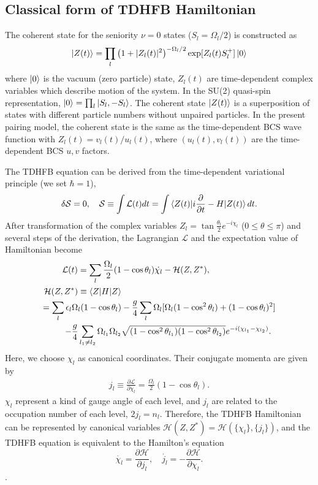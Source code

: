 \documentclass[%
superscriptaddress,
showpacs,
nofootinbib,
amsmath,amssymb,
aps,
prc,
twocolumn,
floatfix ]%
{revtex4-1}
\begin{document}
\subsection{Classical form of TDHFB Hamiltonian}
The coherent state for the seniority $\nu=0$ states
($S_l=\Omega_l/2$) is constructed as
\begin{equation}
	\ket{Z(t)} = \prod_{l} \left(1+|Z_l(t)|^2\right)^{-\Omega_l/2}
	\exp [Z_l(t) S_l^{+}] \ket{0}
 \label{coherent}
\end{equation}
where $\ket{0}$ is the vacuum (zero particle) state,
$Z_l(t)$ are time-dependent complex variables which describe
motion of the system. 
In the SU(2) quasi-spin representation,
$\ket{0}=\prod_l \ket{S_l,-S_l}$.
The coherent state $\ket{Z(t)}$ is a superposition of
states with different particle numbers
without unpaired particles.
In the present pairing model,
the coherent state is the same as the time-dependent BCS wave function
with $Z_l(t)=v_l(t)/u_l(t)$,
where $(u_l(t),v_l(t))$ are the time-dependent BCS $u,v$ factors.

The TDHFB equation can be derived from the time-dependent variational
principle (we set $\hbar=1$),
\begin{equation}
	\delta \mathcal{S} = 0,
	\quad
	\mathcal{S}\equiv \int \mathcal{L}(t) dt =
	\int \braket{Z(t)|i\frac{\partial}{\partial t}-H|Z(t)}dt.
  \label{TDHFB}
\end{equation}
After transformation of the complex variables $Z_l = \tan{\frac{\theta_l}{2}}e^{-i\chi_l}$  ($0\leq\theta\leq\pi$) and several steps of the derivation, the Lagrangian $\mathcal{L}$ and the expectation value of Hamiltonian become
\begin{align}
\mathcal{L}(t) = \sum_l \frac{\Omega_l}{2}
	(1&-\cos{\theta}_l)\dot{\chi_l} - \mathcal{H}(Z,Z^*) ,\\
	\mathcal{H}(Z,Z^*) \equiv \braket{Z|H|Z}& \nonumber \\
  = \sum_l \epsilon_l\Omega_l(1- \cos{\theta}_l)& - \frac{g}{4}\sum_l \Omega_l [\Omega_l(1-\cos^2{\theta}_l)+(1-\cos{\theta}_l)^2] \nonumber \\
- \frac{g}{4}\sum_{l_1\neq l_2} \Omega_{l_1}\Omega_{l_2}&\sqrt{(1-\cos^2{\theta}_{l_1})(1-\cos^2{\theta}_{l_2})}e^{-i(\chi_{l_1}-\chi_{l_2})}   .
\label{TDHFB_Hamiltonian_2}
\end{align}
Here, we choose $\chi_l$ as canonical coordinates. Their conjugate momenta
are given by
\begin{align}
  j_l\equiv \frac{\partial\mathcal{L}}{\partial\dot{\chi}_l}=\frac{\Omega_l}{2}
	(1-\cos{\theta}_l) .
\end{align}
$\chi_l$ represent a kind of gauge angle of each level,
and $j_l$ are related to the occupation number of each level, $2j_l=n_l$. Therefore, the TDHFB Hamiltonian can be represented by canonical variables $\mathcal{H}(Z,Z^*) = \mathcal{H}(\{\chi_l\},\{j_l\})$, and the TDHFB equation is equivalent to the Hamilton's equation
\begin{equation}
	\dot{\chi_l} = \frac{\partial\mathcal{H}}{\partial j_l}, \quad
	\dot{j_l} = -\frac{\partial\mathcal{H}}{\partial \chi_l} .
\end{equation}
.
\end{document}
